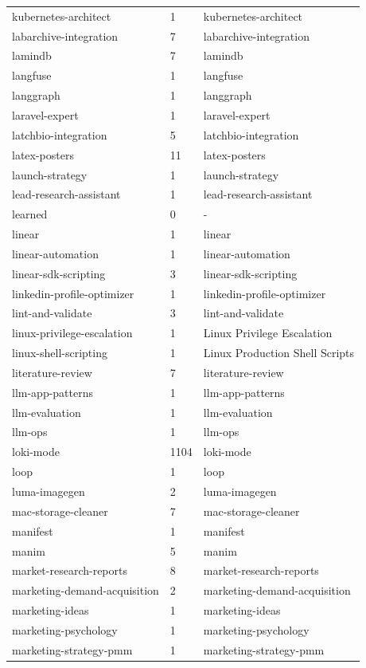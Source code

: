 \begin{longtable}{@{}lll@{}}
kubernetes-architect & 1 & kubernetes-architect\\
labarchive-integration & 7 & labarchive-integration\\
lamindb & 7 & lamindb\\
langfuse & 1 & langfuse\\
langgraph & 1 & langgraph\\
laravel-expert & 1 & laravel-expert\\
latchbio-integration & 5 & latchbio-integration\\
latex-posters & 11 & latex-posters\\
launch-strategy & 1 & launch-strategy\\
lead-research-assistant & 1 & lead-research-assistant\\
learned & 0 & -\\
linear & 1 & linear\\
linear-automation & 1 & linear-automation\\
linear-sdk-scripting & 3 & linear-sdk-scripting\\
linkedin-profile-optimizer & 1 & linkedin-profile-optimizer\\
lint-and-validate & 3 & lint-and-validate\\
linux-privilege-escalation & 1 & Linux Privilege Escalation\\
linux-shell-scripting & 1 & Linux Production Shell Scripts\\
literature-review & 7 & literature-review\\
llm-app-patterns & 1 & llm-app-patterns\\
llm-evaluation & 1 & llm-evaluation\\
llm-ops & 1 & llm-ops\\
loki-mode & 1104 & loki-mode\\
loop & 1 & loop\\
luma-imagegen & 2 & luma-imagegen\\
mac-storage-cleaner & 7 & mac-storage-cleaner\\
manifest & 1 & manifest\\
manim & 5 & manim\\
market-research-reports & 8 & market-research-reports\\
marketing-demand-acquisition & 2 & marketing-demand-acquisition\\
marketing-ideas & 1 & marketing-ideas\\
marketing-psychology & 1 & marketing-psychology\\
marketing-strategy-pmm & 1 & marketing-strategy-pmm\\

\end{longtable}
